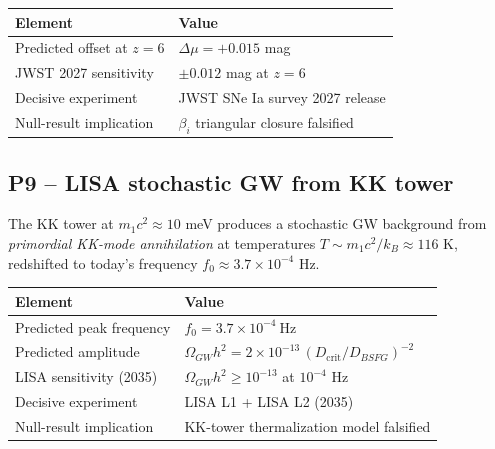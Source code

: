 \documentclass[
]{article}
\newcounter{none} %
\begin{document}
{\def\LTcaptype{none} %
\begin{longtable}[]{@{}ll@{}}
\toprule\noalign{}
Element & Value \\
\midrule\noalign{}
\endhead
\bottomrule\noalign{}
\endlastfoot
Predicted offset at \(z=6\) & \(\Delta\mu = +0.015\) mag \\
JWST 2027 sensitivity & \(\pm 0.012\) mag at \(z=6\) \\
Decisive experiment & JWST SNe Ia survey 2027 release \\
Null-result implication & \(\beta_i\) triangular closure falsified \\
\end{longtable}
}

\subsection{P9 -- LISA stochastic GW from KK
tower}\label{p9-lisa-stochastic-gw-from-kk-tower}

The KK tower at \(m_1 c^2 \approx 10\) meV produces a stochastic GW
background from \emph{primordial KK-mode annihilation} at temperatures
\(T \sim m_1 c^2/k_B \approx 116\) K, redshifted to today's frequency
\(f_0 \approx 3.7\times 10^{-4}\) Hz.

{\def\LTcaptype{none} %
\begin{longtable}[]{@{}
  >{\raggedright\arraybackslash}p{}
  >{\raggedright\arraybackslash}p{}@{}}
\toprule\noalign{}
\begin{minipage}[b]{\linewidth}\raggedright
Element
\end{minipage} & \begin{minipage}[b]{\linewidth}\raggedright
Value
\end{minipage} \\
\midrule\noalign{}
\endhead
\bottomrule\noalign{}
\endlastfoot
Predicted peak frequency & \(f_0 = 3.7\times 10^{-4}\ \mathrm{Hz}\) \\
Predicted amplitude &
\(\Omega_{GW} h^2 = 2\times 10^{-13}\,(D_{\mathrm{crit}}/D_{BSFG})^{-2}\) \\
LISA sensitivity (2035) & \(\Omega_{GW} h^2 \geq 10^{-13}\) at
\(10^{-4}\) Hz \\
Decisive experiment & LISA L1 + LISA L2 (2035) \\
Null-result implication & KK-tower thermalization model falsified \\
\end{longtable}
}
\end{document}
